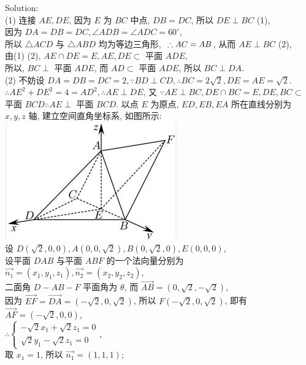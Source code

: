 \documentclass[a4paper,11pt,UTF8]{article}
\begin{document}
Solution:\\
(1) 连接 $A E, D E$, 因为 $E$ 为 $B C$ 中点, $D B=D C$, 所以 $D E \perp B C$ (1),\\
因为 $D A=D B=D C, \angle A D B=\angle A D C=60^{\circ}$,\\ 所以 $\triangle A C D$ 与 $\triangle A B D$ 均为等边三角形, $\\\therefore A C=A B$, 从而 $A E \perp B C$ (2),\\ 由(1) (2), $A E \cap D E=E, A E, D E \subset$ 平面 $A D E$,\\
所以, $B C \perp$ 平面 $A D E$, 而 $A D \subset$ 平面 $A D E$, 所以 $B C \perp D A$.\\
(2) 不妨设 $D A=D B=D C=2, \because B D \perp C D, \therefore B C=2 \sqrt{2}, D E=A E=\sqrt{2}$.\\
$\therefore A E^2+D E^2=4=A D^2, \therefore A E \perp D E$, 又 $\because A E \perp B C, D E \cap B C=E, D E, B C \subset$ 平面 $B C D \therefore A E \perp$ 平面 $B C D$.
以点 $E$ 为原点, $E D, E B, E A$ 所在直线分别为 $x, y, z$ 轴, 建立空间直角坐标系, 如图所示:\\
\includegraphics[scale=0.8]{./2023_new2s.jpg}\\
设 $D(\sqrt{2}, 0,0), A(0,0, \sqrt{2}), B(0, \sqrt{2}, 0), E(0,0,0)$,\\
设平面 $D A B$ 与平面 $A B F$ 的一个法向量分别为 $\overrightarrow{n_1}=\left(x_1, y_1, z_1\right), \overrightarrow{n_2}=\left(x_2, y_2, z_2\right)$,\\
二面角 $D-A B-F$ 平面角为 $\theta$, 而 $\overrightarrow{A B}=(0, \sqrt{2},-\sqrt{2})$,\\
因为 $\overrightarrow{E F}=\overrightarrow{D A}=(-\sqrt{2}, 0, \sqrt{2})$, 所以 $F(-\sqrt{2}, 0, \sqrt{2})$, 即有 $\overrightarrow{A F}=(-\sqrt{2}, 0,0)$,\\
$\therefore\left\{\begin{array}{l}-\sqrt{2} x_1+\sqrt{2} z_1=0 \\ \sqrt{2} y_1-\sqrt{2} z_1=0\end{array}\right.$,\\ 取 $x_1=1$, 所以 $\overrightarrow{n_1}=(1,1,1)$;\\
\end{document}
